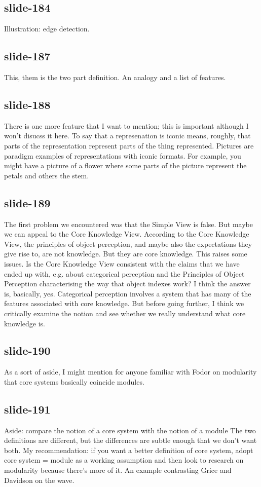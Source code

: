 \documentclass[12pt,\papersize]{extarticle}
\begin{document}
 
\subsection{slide-184}
Illustration: edge detection.
 
 
\subsection{slide-187}
This, them is the two part definition. An analogy and a list of features.
 
 
\subsection{slide-188}
There is one more feature that I want to mention; this is important although I won't disucss it here.
To say that a represenation is iconic means, roughly, that parts of the representation represent parts of the thing represented.
Pictures are paradigm examples of representations with iconic formats.
For example, you might have a picture of a flower where some parts of the picture represent the petals and others the stem.
 
 
\subsection{slide-189}
The first problem we encountered was that the Simple View is false. But maybe we can appeal to the Core Knowledge View.
According to the Core Knowledge View, the principles of object perception, and maybe also the expectations they give rise to, are not knowledge. But they are core knowledge.
This raises some issues. Is the Core Knowledge View consistent with the claims that we have ended up with, e.g. about categorical perception and the Principles of Object Perception characterising the way that object indexes work? I think the answer is, basically, yes. Categorical perception involves a system that has many of the features associated with core knowledge.
But before going further, I think we critically examine the notion and see whether we really understand what core knowledge is.
 
 
\subsection{slide-190}
As a sort of aside, I might mention for anyone familiar with Fodor on modularity that core systems basically coincide modules.
 
 
\subsection{slide-191}
Aside: compare the notion of a core system with the notion of a module
The two definitions are different, but the differences are subtle enough that we don't want both.
My recommendation: if you want a better definition of core system, adopt core system = module as a working assumption and then look to research on modularity because there's more of it.
An example contrasting Grice and Davidson on the wave.
 
\end{document}
